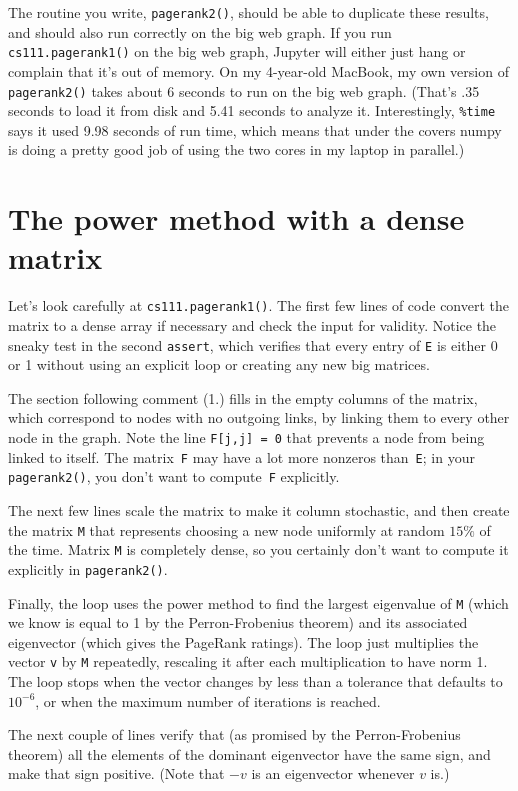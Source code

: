 \documentclass[11pt]{article}
\begin{document}
The routine you write, {\tt pagerank2()}, should be able to duplicate
these results, and should also run correctly on the big web graph.
If you run {\tt cs111.pagerank1()} on the big web graph, 
Jupyter will either just hang or complain that it's out of memory.
On my 4-year-old MacBook, my own version of {\tt pagerank2()} 
takes about 6 seconds to run on the big web graph.
(That's .35 seconds to load it from disk and 5.41 seconds to analyze it.
Interestingly, {\tt \%time} says it used 9.98 seconds of run time, 
which means that under the covers numpy is doing a pretty good job of
using the two cores in my laptop in parallel.)

\section{The power method with a dense matrix}

Let's look carefully at {\tt cs111.pagerank1()}.
The first few lines of code convert the matrix to a dense
array if necessary and check the input for validity.
Notice the sneaky test in the second {\tt assert}, which
verifies that every entry of {\tt E} is either 0 or 1 without
using an explicit loop or creating any new big matrices.

The section following comment (1.) fills in the empty
columns of the matrix, which correspond to nodes with
no outgoing links, by linking them to every other
node in the graph. 
Note the line {\tt F[j,j] = 0} that prevents a node
from being linked to itself.
The matrix~{\tt F} may have a lot more nonzeros than~{\tt E}; 
in your {\tt pagerank2()}, you don't want to compute~{\tt F} explicitly.

The next few lines scale the matrix to make it column stochastic, 
and then create the matrix {\tt M} that represents choosing
a new node uniformly at random $15\%$ of the time. 
Matrix {\tt M} is completely dense, so you certainly 
don't want to compute it explicitly in {\tt pagerank2()}.

Finally, the loop uses the power method to find the largest
eigenvalue of {\tt M} (which we know is equal to 1
by the Perron-Frobenius theorem) and its associated
eigenvector (which gives the PageRank ratings).
The loop just multiplies the vector {\tt v} by {\tt M} repeatedly, 
rescaling it after each multiplication to have norm 1.  
The loop stops when the vector changes by less than a
tolerance that defaults to $10^{-6}$, or when the maximum
number of iterations is reached.

The next couple of lines verify that (as promised by the
Perron-Frobenius theorem) all the elements of the dominant
eigenvector have the same sign, and make that sign positive. 
(Note that $-v$ is an eigenvector whenever $v$ is.)
\end{document}
